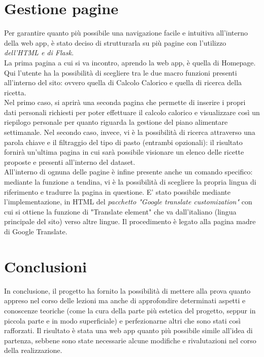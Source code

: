 \documentclass[11pt]{article}
\begin{document}
\section{Gestione pagine}Per garantire quanto più possibile una navigazione facile e intuitiva all'interno della web app, è stato deciso di strutturarla su più pagine con l'utilizzo \textit{dell'HTML e di Flask. }\\
La prima pagina a cui si va incontro, aprendo la web app, è quella di Homepage. Qui l'utente ha la possibilità di scegliere tra le due macro funzioni presenti all’interno del sito: ovvero quella di Calcolo Calorico e quella di ricerca della ricetta. \\
Nel primo caso, si aprirà una seconda pagina che permette di inserire i propri dati personali richiesti per poter effettuare il calcolo calorico e visualizzare così un riepilogo personale per quanto riguarda la gestione del piano alimentare settimanale. Nel secondo caso, invece, vi è la possibilità di ricerca attraverso una parola chiave e il filtraggio del tipo di pasto (entrambi opzionali): il risultato fornirà un’ultima pagina in cui sarà possibile visionare un elenco delle ricette proposte e presenti all’interno del dataset.\\
All'interno di ognuna delle pagine è infine presente anche un comando specifico: mediante la funzione a tendina, vi è la possibilità di scegliere la propria lingua di riferimento e tradurre la pagina in questione. E' stato possibile mediante l'implementazione, in HTML del \textit{pacchetto "Google translate customization"} con cui si ottiene la funzione di "Translate element" che va dall'italiano (lingua principale del sito) verso altre lingue. Il procedimento è legato alla pagina madre di Google Translate. 

\section{Conclusioni} In conclusione, il progetto ha fornito la possibilità di mettere alla prova quanto appreso nel corso delle lezioni ma anche di approfondire determinati aspetti e conoscenze teoriche (come la cura della parte più estetica del progetto, seppur in piccola parte e in modo superficiale) e perfezionarne altri che sono stati così rafforzati. Il risultato è stata una web app quanto più possibile simile all’idea di partenza, sebbene sono state necessarie alcune modifiche e rivalutazioni nel corso della realizzazione. 
\end{document}
